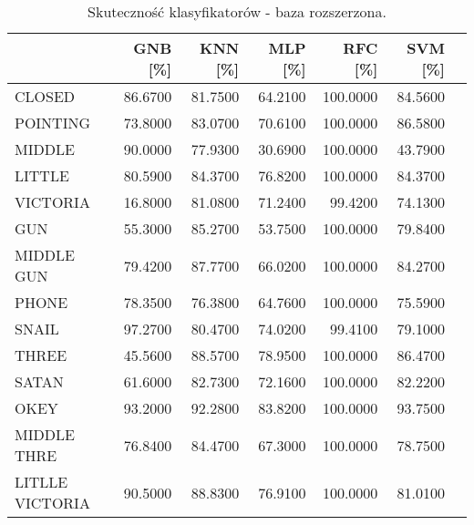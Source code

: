 \newpage
\begin{landscape}

\begin{table}[]
\centering
\caption{Skuteczność klasyfikatorów - baza rozszerzona.}
\label{table:results}
\begin{tabular}{l|rrrrrr}
& GNB [\%] & KNN [\%] & MLP [\%] & RFC [\%] & SVM [\%] &  \\ \hline
CLOSED            & 86.6700           & 81.7500           & 64.2100           & 100.0000          & 84.5600           &  \\
POINTING          & 73.8000           & 83.0700           & 70.6100           & 100.0000          & 86.5800           &  \\
MIDDLE            & 90.0000           & 77.9300           & 30.6900           & 100.0000          & 43.7900           &  \\
LITTLE            & 80.5900           & 84.3700           & 76.8200           & 100.0000          & 84.3700           &  \\
VICTORIA          & 16.8000           & 81.0800           & 71.2400           & 99.4200           & 74.1300           &  \\
GUN               & 55.3000           & 85.2700           & 53.7500           & 100.0000          & 79.8400           &  \\
MIDDLE GUN        & 79.4200           & 87.7700           & 66.0200           & 100.0000          & 84.2700           &  \\
PHONE             & 78.3500           & 76.3800           & 64.7600           & 100.0000          & 75.5900           &  \\
SNAIL             & 97.2700           & 80.4700           & 74.0200           & 99.4100           & 79.1000           &  \\
THREE             & 45.5600           & 88.5700           & 78.9500           & 100.0000          & 86.4700           &  \\
SATAN             & 61.6000           & 82.7300           & 72.1600           & 100.0000          & 82.2200           &  \\
OKEY              & 93.2000           & 92.2800           & 83.8200           & 100.0000          & 93.7500           &  \\
MIDDLE THRE       & 76.8400           & 84.4700           & 67.3000           & 100.0000          & 78.7500           &  \\
LITLLE VICTORIA   & 90.5000           & 88.8300           & 76.9100           & 100.0000          & 81.0100           &  \\

\end{tabular}
\end{table}
\end{landscape}
